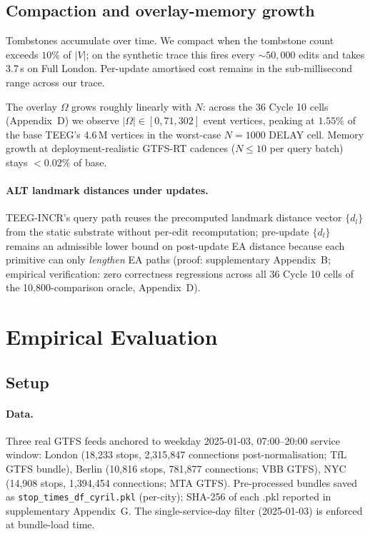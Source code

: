 \documentclass[letterpaper]{article}
\theoremstyle{definition}
\theoremstyle{plain}
\begin{document}
\subsection{Compaction and overlay-memory growth}

Tombstones accumulate over time. We compact when the tombstone count exceeds
$10\%$ of $|V|$; on the synthetic trace this fires every $\sim 50{,}000$ edits
and takes 3.7\,s on Full London. Per-update amortised cost remains
in the sub-millisecond range across our trace.

The overlay $\Omega$ grows roughly linearly with $N$: across the 36
Cycle 10 cells (Appendix~D) we observe $|\Omega| \in [0, 71{,}302]$
event vertices, peaking at $1.55\%$ of the base TEEG's 4.6\,M
vertices in the worst-case $N\!=\!1000$ DELAY cell. Memory growth at
deployment-realistic GTFS-RT cadences ($N \leq 10$ per query batch)
stays $<\!0.02\%$ of base.

\paragraph{ALT landmark distances under updates.}
TEEG-INCR's query path reuses the precomputed landmark distance
vector $\{d_l\}$ from the static substrate without per-edit
recomputation; pre-update $\{d_l\}$ remains an admissible lower
bound on post-update EA distance because each primitive can only
\emph{lengthen} EA paths (proof: supplementary Appendix~B; empirical
verification: zero correctness regressions across all 36 Cycle 10
cells of the 10{,}800-comparison oracle, Appendix~D).

\section{Empirical Evaluation}
\label{sec:eval}

\subsection{Setup}

\paragraph{Data.} Three real GTFS feeds anchored to weekday 2025-01-03,
07:00--20:00 service window: London (18{,}233 stops, 2{,}315{,}847
connections post-normalisation; TfL GTFS bundle), Berlin (10{,}816
stops, 781{,}877 connections; VBB GTFS), NYC (14{,}908 stops,
1{,}394{,}454 connections; MTA GTFS). Pre-processed bundles
saved as \texttt{stop\_times\_df\_cyril.pkl} (per-city); SHA-256 of each
.pkl reported in supplementary Appendix~G. The single-service-day
filter (2025-01-03) is enforced at bundle-load time.
\end{document}

